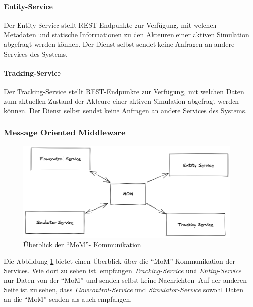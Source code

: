 \paragraph{Entity-Service}

Der Entity-Service stellt REST-Endpunkte zur Verfügung, mit welchen Metadaten und statische Informationen zu den Akteuren einer aktiven Simulation abgefragt werden können.
Der Dienst selbst sendet keine Anfragen an andere Services des Systems.

\paragraph{Tracking-Service}

Der Tracking-Service stellt REST-Endpunkte zur Verfügung, mit welchen Daten zum aktuellen Zustand der Akteure einer aktiven Simulation abgefragt werden können.
Der Dienst selbst sendet keine Anfragen an andere Services des Systems.

\subsubsection{Message Oriented Middleware}

\begin{figure}[h]
	\centering
	\includegraphics[width=1.02\textwidth]{./figures/mom_communication.png}
	\caption{Überblick der \enquote{MoM}- Kommunikation}
	\label{fig:kom_mom_overview}
\end{figure}

Die Abbildung \ref{fig:kom_mom_overview} bietet einen Überblick über die \enquote{MoM}-Kommunikation der Services.
Wie dort zu sehen ist, empfangen \textit{Tracking-Service} und \textit{Entity-Service} nur Daten von der \enquote{MoM} und senden selbst keine Nachrichten.
Auf der anderen Seite ist zu sehen, dass \textit{Flowcontrol-Service} und \textit{Simulator-Service} sowohl Daten an die \enquote{MoM} senden als auch empfangen. 

